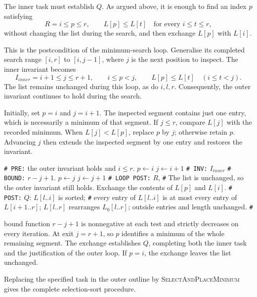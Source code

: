 The inner task must establish $Q$. As argued above, it is enough to
find an index $p$ satisfying
\[
R = i\leq p\leq r,\qquad
L[p]\leq L[t]\quad\text{for every }i\leq t\leq r,
\]
without changing the list during the search, and then exchange
$L[p]$ with $L[i]$.

This is the postcondition of the minimum-search loop. Generalise
its completed search range $[i,r]$ to $[i,j-1]$, where $j$ is the
next position to inspect. The inner invariant becomes
\[
I _{inner} = i+1\leq j\leq r+1,\qquad
i\leq p<j,\qquad
L[p]\leq L[t]\quad(i\leq t<j).
\]
The list remains unchanged during this loop, as do $i,l,r$.
Consequently, the outer invariant continues to hold during the search.

Initially, set $p=i$ and $j=i+1$. The inspected segment contains
just one entry, which is necessarily a minimum of that segment.
If $j\leq r$, compare $L[j]$ with the recorded minimum.
When $L[j]<L[p]$, replace $p$ by $j$; otherwise retain $p$.
Advancing $j$ then extends the inspected segment by one entry
and restores the invariant.

\begin{algorithm}[H]
\begin{algorithmic}[1]
\Statex \texttt{\# PRE:} the outer invariant holds and $i\leq r$.
\State $p\leftarrow i$
\State $j\leftarrow i+1$
\Statex \texttt{\# INV:} $I_{inner}$
\Statex \texttt{\# BOUND:} $r-j+1$.
        \State $p\leftarrow j$
    \EndIf
    \State $j\leftarrow j+1$
\EndWhile
\Statex \texttt{\# LOOP POST:} $R$,
\Statex \texttt{\#} The list is unchanged, so the outer invariant still holds.
\State Exchange the contents of $L[p]$ and $L[i]$.
\Statex \texttt{\# POST:} $Q$: $L[l..i]$ is sorted;
\Statex \texttt{\#} every entry of $L[l..i]$ is at most every entry of $L[i+1..r]$; $L[l..r]$ rearranges $L_0[l..r]$;
outside entries and length unchanged.
\Statex \texttt{\#} 
\EndProcedure
\end{algorithmic}
\caption{The independent refinement of the inner task.}
\end{algorithm}

 bound function $r-j+1$ is nonnegative at each test and strictly
decreases on every iteration. At exit $j=r+1$, so $p$ identifies a
minimum of the whole remaining segment. The exchange establishes
$Q$, completing both the inner task and the justification of the
outer loop. If $p=i$, the exchange leaves the list unchanged.

Replacing the specified task in the outer outline by
\textsc{SelectAndPlaceMinimum} gives the complete selection-sort
procedure.

